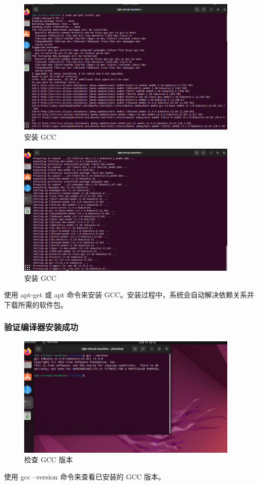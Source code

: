 \documentclass[UTF8]{ctexart}
\begin{document}
\begin{figure}[H]
    \centering
    \includegraphics[width=0.95\textwidth]{picture/Screenshot 2024-10-14 200918.png}
    \caption{安装 GCC}
\end{figure}
\begin{figure}[H]
    \centering
    \includegraphics[width=0.95\textwidth]{picture/Screenshot 2024-10-14 200844.png}
    \caption{安装 GCC}
\end{figure}
使用 apt-get 或 apt 命令来安装 GCC。安装过程中，系统会自动解决依赖关系并下载所需的软件包。

\subsubsection{验证编译器安装成功}
\begin{figure}[H]
    \centering
    \includegraphics[width=0.95\textwidth]{picture/Screenshot 2024-10-14 201650.png}
    \caption{检查 GCC 版本}
\end{figure}
使用 gcc --version 命令来查看已安装的 GCC 版本。
\end{document}
